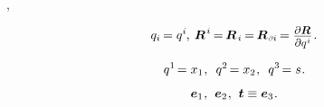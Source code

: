 ,  

\nopagebreak\vspace{-0.2em}\begin{equation*}
q_{i} \hspace{-0.2ex} = q^{i} \hspace{-0.1ex}
, \hspace{.5ex}
\RepresentedLocationVector^{\hspace{.1ex}i} \hspace{-0.2ex} = \hspace{-0.2ex} \RepresentedLocationVector_{\hspace{.1ex}i} \hspace{-0.2ex} = \hspace{-0.2ex} \RepresentedLocationVector_{\hspace{.1ex}\differentialindex{i}} \hspace{-0.2ex}
= \scalebox{.88}{$ \displaystyle\frac{\raisebox{-0.2em}{$ \partial \RepresentedLocationVector $}}{\partial q^{\hspace{.1ex}i}} $}
\hspace{.2ex} .
\end{equation*}

\vspace{-0.2em}
\ru{\:---}

\nopagebreak\vspace{-0.2em}\begin{equation*}
q^{1} \hspace{-0.3ex} = x_{1}
\hspace{.1ex} , \hspace{.5em}
q^{2} \hspace{-0.3ex} = x_{2}
\hspace{.1ex} , \hspace{.5em}
q^{3} \hspace{-0.3ex} = s
\hspace{.1ex} .
\end{equation*}

\vspace{-0.2em}
 

\nopagebreak\vspace{-0.4em}\begin{equation*}
\bm{e}_{1}
\hspace{.1ex} , \hspace{.4em}
\bm{e}_{2}
\hspace{.1ex} , \hspace{.4em}
\bm{t} \equiv \bm{e}_{3}
\hspace{.1ex} .
\end{equation*}

